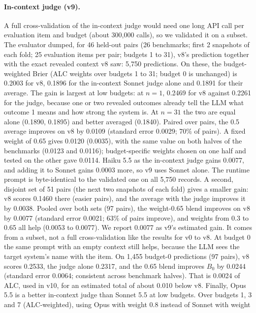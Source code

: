 \documentclass{article}
\begin{document}
\paragraph{In-context judge (v9).} A full cross-validation of the in-context judge would need one
long API call per evaluation item and budget (about 300,000 calls), so we validated it on a subset.
The evaluator dumped, for 46 held-out pairs (26 benchmarks; first 2 snapshots of each fold; 25
evaluation items per pair; budgets 1 to 31), v8's prediction together with the exact revealed context
v8 saw: 5,750 predictions. On these, the budget-weighted Brier (ALC weights over budgets 1 to 31;
budget 0 is unchanged) is 0.2003 for v8, 0.1896 for the in-context Sonnet judge alone and 0.1891 for
their average. The gain is largest at low budgets: at $n=1$, 0.2469 for v8 against 0.2261 for the
judge, because one or two revealed outcomes already tell the LLM what outcome 1 means and how
strong the system is. At $n=31$ the two are equal alone (0.1890, 0.1895) and better averaged
(0.1840). Paired over pairs, the 0.5 average improves on v8 by 0.0109 (standard error 0.0029; 70\%
of pairs). A fixed weight of 0.65 gives 0.0120 (0.0035), with the same value on both halves of the
benchmarks (0.0123 and 0.0116); budget-specific weights chosen on one half and tested on the other
gave 0.0114. Haiku 5.5 as the in-context judge gains 0.0077, and adding it to Sonnet gains 0.0003
more, so v9 uses Sonnet alone. The runtime prompt is byte-identical to the validated one on all
5,750 records. A second, disjoint set of 51 pairs (the next two snapshots of each fold) gives a
smaller gain: v8 scores 0.1460 there (easier pairs), and the average with the judge improves it by
0.0038. Pooled over both sets (97 pairs), the weight-0.65 blend improves on v8 by 0.0077 (standard
error 0.0021; 63\% of pairs improve), and weights from 0.3 to 0.65 all help (0.0053 to 0.0077). We
report 0.0077 as v9's estimated gain. It comes from a subset, not a full cross-validation like the
results for v0 to v8. At budget 0 the same prompt with an empty context still helps, because the LLM
sees the target system's name with the item. On 1,455 budget-0 predictions (97 pairs), v8 scores
0.2533, the judge alone 0.2317, and the 0.65 blend improves $B_0$ by 0.0244 (standard error 0.0064;
consistent across benchmark halves). That is 0.0024 of ALC, used in v10, for an estimated total of
about 0.010 below v8. Finally, Opus 5.5 is a better in-context judge than Sonnet 5.5 at low budgets.
Over budgets 1, 3 and 7 (ALC-weighted), using Opus with weight 0.8 instead of Sonnet with weight
\end{document}
